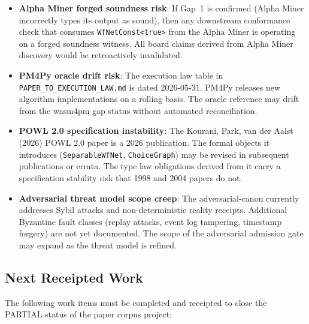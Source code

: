 \begin{itemize}
  \item \textbf{Alpha Miner forged soundness risk}: If Gap~1 is confirmed
    (Alpha Miner incorrectly types its output as sound), then any downstream
    conformance check that consumes \texttt{WfNetConst<true>} from the Alpha
    Miner is operating on a forged soundness witness. All board claims derived
    from Alpha Miner discovery would be retroactively invalidated.

  \item \textbf{PM4Py oracle drift risk}: The execution law table in
    \texttt{PAPER\_TO\_EXECUTION\_LAW.md} is dated 2026-05-31. PM4Py releases
    new algorithm implementations on a rolling basis. The oracle reference may
    drift from the wasm4pm gap status without automated reconciliation.

  \item \textbf{POWL 2.0 specification instability}: The Kourani, Park, van
    der Aalst (2026) POWL 2.0 paper is a 2026 publication. The formal objects
    it introduces (\texttt{SeparableWfNet}, \texttt{ChoiceGraph}) may be
    revised in subsequent publications or errata. The type law obligations
    derived from it carry a specification stability risk that 1998 and 2004
    papers do not.

  \item \textbf{Adversarial threat model scope creep}: The adversarial-canon
    currently addresses Sybil attacks and non-deterministic reality receipts.
    Additional Byzantine fault classes (replay attacks, event log tampering,
    timestamp forgery) are not yet documented. The scope of the adversarial
    admission gate may expand as the threat model is refined.
\end{itemize}

\subsection{Next Receipted Work}
\label{sec:sources-papers-open-next}

The following work items must be completed and receipted to close the PARTIAL
status of the paper corpus project:

